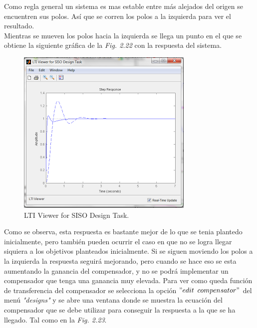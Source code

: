 \documentclass[a4paper,12pt,twoside]{proyectotanquesecci}
\begin{document}
Como regla general un sistema es mas estable entre más alejados del origen se encuentren sus polos. Así que se corren los polos a la izquierda para ver el resultado. \\

Mientras se mueven los polos hacia la izquierda se llega un punto en el que se obtiene la siguiente gráfica de la \textit{Fig. 2.22} con la respuesta del sistema. \\

\begin{figure}[h]
\centering
\includegraphics[scale=0.6]{Ventana16}
\renewcommand{\figurename}{Fig.}
\caption{LTI Viewer for SISO Design Task.}
\label{LTI Viewer for SISO Design Task.}
\end{figure}

Como se observa, esta respuesta es bastante mejor de lo que se tenia plantedo inicialmente, pero también pueden ocurrir el caso en que no se logra llegar siquiera a los objetivos planteados inicialmente. Si se siguen moviendo los polos a la izquierda la respuesta seguirá mejorando, pero cuando se hace eso se esta aumentando la ganancia del compensador, y no se podrá implementar un compensador que tenga una ganancia muy elevada. Para ver como queda función de transferencia del compensador se selecciona la opción $"edit$ $compensator"$ del menú \textit{"designs"} y se abre una ventana donde se muestra la ecuación del compensador que se debe utilizar para conseguir la respuesta a la que se ha llegado. Tal como en la \textit{Fig. 2.23}. \\
\end{document}
